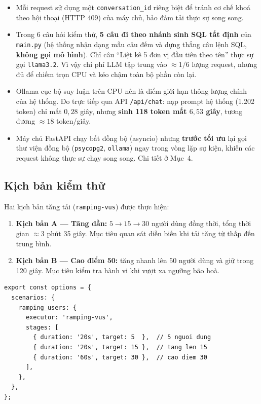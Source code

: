 \documentclass[12pt,a4paper]{article}
\begin{document}
\begin{itemize}
  \item Mỗi request sử dụng một \texttt{conversation\_id} riêng biệt để tránh cơ
  chế khoá theo hội thoại (HTTP 409) của máy chủ, bảo đảm tải thực sự song song.
  \item Trong 6 câu hỏi kiểm thử, \textbf{5 câu đi theo nhánh sinh SQL tất định}
  của \texttt{main.py} (hệ thống nhận dạng mẫu câu đếm và dựng thẳng câu lệnh SQL,
  \textbf{không gọi mô hình}). Chỉ câu ``Liệt kê 5 đơn vị đầu tiên theo tên'' thực
  sự gọi \texttt{llama3.2}. Vì vậy chi phí LLM tập trung vào $\approx 1/6$ lượng
  request, nhưng đủ để chiếm trọn CPU và kéo chậm toàn bộ phần còn lại.
  \item Ollama cục bộ suy luận trên CPU nên là điểm giới hạn thông lượng chính
  của hệ thống. Đo trực tiếp qua API \texttt{/api/chat}: nạp prompt hệ thống
  (1.202 token) chỉ mất $0{,}28$ giây, nhưng \textbf{sinh 118 token mất $6{,}53$
  giây}, tương đương $\approx 18$ token/giây.
  \item Máy chủ FastAPI chạy bất đồng bộ (asyncio) nhưng \textbf{trước tối ưu} lại
  gọi thư viện đồng bộ (\texttt{psycopg2}, \texttt{ollama}) ngay trong vòng lặp sự
  kiện, khiến các request không thực sự chạy song song. Chi tiết ở Mục~4.
\end{itemize}

\subsection{Kịch bản kiểm thử}

Hai kịch bản tăng tải (\texttt{ramping-vus}) được thực hiện:

\begin{enumerate}
  \item \textbf{Kịch bản A --- Tăng dần:} $5 \to 15 \to 30$ người dùng đồng thời,
  tổng thời gian $\approx 3$ phút 35 giây. Mục tiêu quan sát diễn biến khi tải
  tăng từ thấp đến trung bình.
  \item \textbf{Kịch bản B --- Cao điểm 50:} tăng nhanh lên $50$ người dùng và giữ
  trong 120 giây. Mục tiêu kiểm tra hành vi khi vượt xa ngưỡng bão hoà.
\end{enumerate}

\begin{lstlisting}[language=JS,caption={Trích cấu hình kịch bản tăng tải trong k6}]
export const options = {
  scenarios: {
    ramping_users: {
      executor: 'ramping-vus',
      stages: [
        { duration: '20s', target: 5  },  // 5 nguoi dung
        { duration: '20s', target: 15 },  // tang len 15
        { duration: '60s', target: 30 },  // cao diem 30
      ],
    },
  },
};
\end{lstlisting}
\end{document}
